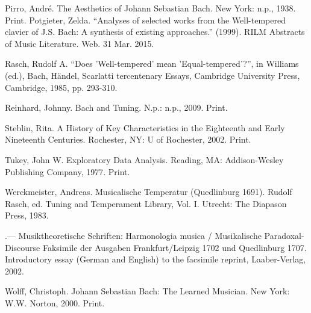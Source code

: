 \begin{hangparas}{0.5in}{1}
Pirro, André. The Aesthetics of Johann Sebastian Bach. New York: n.p., 1938.  Print. Potgieter, Zelda. ``Analyses of selected works from the Well-tempered clavier of J.S.  Bach: A synthesis of existing approaches.'' (1999). RILM Abstracts of Music Literature. Web. 31 Mar. 2015.

Rasch, Rudolf A. ``Does 'Well-tempered' mean 'Equal-tempered'?'', in Williams (ed.), Bach, Händel, Scarlatti tercentenary Essays, Cambridge University Press, Cambridge, 1985, pp. 293-310.

Reinhard, Johnny. Bach and Tuning. N.p.: n.p., 2009. Print.

Steblin, Rita. A History of Key Characteristics in the Eighteenth and
Early Nineteenth Centuries. Rochester, NY: U of Rochester, 2002. Print.

Tukey, John W. Exploratory Data Analysis. Reading, MA: Addison-Wesley
Publishing Company, 1977. Print.

Werckmeister, Andreas. Musicalische Temperatur (Quedlinburg 1691).  Rudolf Rasch, ed. Tuning and Temperament Library, Vol. I. Utrecht: The Diapason Press, 1983.

.--- Musiktheoretische Schriften: Harmonologia musica / Musikalische Paradoxal- Discourse Faksimile der Ausgaben Frankfurt/Leipzig 1702 und Quedlinburg 1707. Introductory essay (German and English) to the facsimile reprint, Laaber-Verlag, 2002.

Wolff, Christoph. Johann Sebastian Bach: The Learned Musician. New York: W.W.  Norton, 2000. Print.
\end{hangparas}
